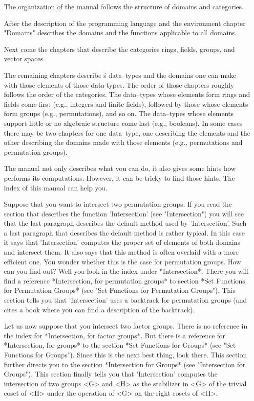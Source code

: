 The organization  of the  manual  follows the  structure  of  domains and
categories.

After  the  description  of the programming language and  the environment
chapter "Domains" describes the  domains and the  functions applicable to
all domains.

Next  come  the  chapters  that describe  the  categories  rings, fields,
groups, and vector  spaces.

The remaining chapters describe {\GAP}\'s data--types and the domains one
can make with those  elements of those data-types.   The  order  of those
chapters roughly follows  the order of  the categories.   The data--types
whose elements  form rings  and  fields come  first (e.g.,  integers  and
finite  fields),  followed by those  whose  elements form  groups  (e.g.,
permutations), and  so on.  The data--types whose elements support little
or  no algebraic  structure come  last (e.g., booleans).   In  some cases
there may be two chapters for one data--type, one describing the elements
and the  other  describing the  domains  made with  those elements (e.g.,
permutations and permutation groups).

The {\GAP} manual  not only describes what you can do, it also gives some
hints how {\GAP} performs its computations.  However, it can be tricky to
find those hints.  The index of this manual can help you.

Suppose that you want to intersect  two  permutation groups.  If you read
the   section   that   describes   the   function   'Intersection'   (see
"Intersection")  you  will see  that  the last  paragraph  describes  the
default  method  used  by 'Intersection'.   Such  a last  paragraph  that
describes  the  default method is  rather  typical.  In this case it says
that  'Intersection' computes the proper  set of elements of both domains
and intersect  them.   It also says that  this method is often   overlaid
with a more efficient  one.  You wonder whether  this  is  the  case  for
permutation groups.  How can you  find out?   Well you  look in the index
under *Intersection*.  There you will find a reference *Intersection, for
permutation groups* to  section  *Set Functions  for Permutation  Groups*
(see  "Set Functions  for  Permutation Groups").  This  section tells you
that 'Intersection' uses a backtrack for permutation groups (and cites  a
book where you can find a description of the backtrack).

Let us  now suppose that  you intersect two  factor groups.  There  is no
reference in the index for *Intersection,  for factor groups*.  But there
is  a  reference  for  *Intersection, for  groups*  to  the  section *Set
Functions  for  Groups* (see "Set  Functions for Groups").  Since this is
the next best thing, look there.  This section further directs you to the
section *Intersection for Groups* (see  "Intersection for Groups").  This
section finally  tells you that  'Intersection' computes the intersection
of two groups <G> and  <H> as the stabilizer in <G> of the trivial  coset
of <H> under the operation of <G> on the right cosets of <H>.

